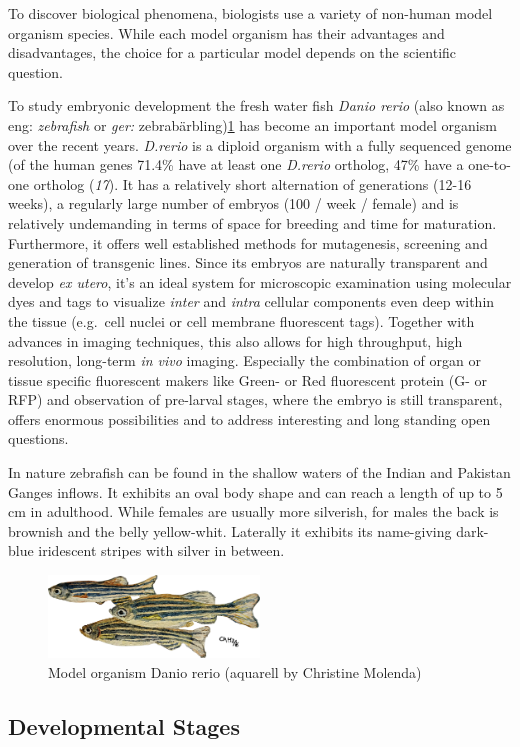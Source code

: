\documentclass[11pt,singlespacinge,twoside]{reedthesis} %
\begin{document}
To discover biological phenomena, biologists use a variety of non-human model organism species. While each model organism has their advantages and disadvantages, the choice for a particular model depends on the scientific question.

To study embryonic development the fresh water fish \emph{Danio rerio} (also known as eng: \emph{zebrafish} or \emph{ger:} zebrabärbling)\ref{fig:zebra} has become an important model organism over the recent years. \emph{D.rerio} is a diploid organism with a fully sequenced genome (of the human genes 71.4\% have at least one \emph{D.rerio} ortholog, 47\% have a one-to-one ortholog (\emph{17}). It has a relatively short alternation of generations (12-16 weeks), a regularly large number of embryos (100 / week / female) and is relatively undemanding in terms of space for breeding and time for maturation. Furthermore, it offers well established methods for mutagenesis, screening and generation of transgenic lines. Since its embryos are naturally transparent and develop \emph{ex utero}, it's an ideal system for microscopic examination using molecular dyes and tags to visualize \emph{inter} and \emph{intra} cellular components even deep within the tissue (e.g.~cell nuclei or cell membrane fluorescent tags). Together with advances in imaging techniques, this also allows for high throughput, high resolution, long-term \emph{in vivo} imaging. Especially the combination of organ or tissue specific fluorescent makers like Green- or Red fluorescent protein (G- or RFP) and observation of pre-larval stages, where the embryo is still transparent, offers enormous possibilities and to address interesting and long standing open questions.

In nature zebrafish can be found in the shallow waters of the Indian and Pakistan Ganges inflows. It exhibits an oval body shape and can reach a length of up to 5 cm in adulthood. While females are usually more silverish, for males the back is brownish and the belly yellow-whit. Laterally it exhibits its name-giving dark-blue iridescent stripes with silver in between.
\begin{figure}

{\centering \includegraphics[width=0.50\textwidth]{figures/intro/CM_fish} 

}

\caption{Model organism Danio rerio (aquarell by Christine Molenda)}\label{fig:zebra}
\end{figure}
\hypertarget{developmental-stages}{%
\subsection{Developmental Stages}\label{developmental-stages}}
\end{document}
